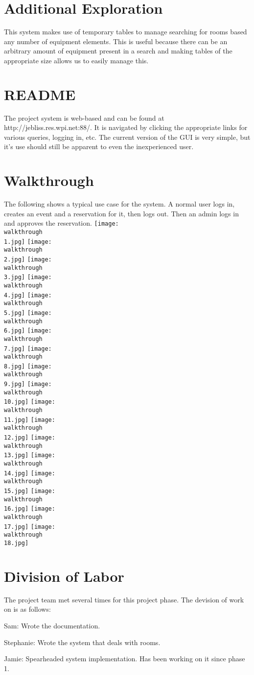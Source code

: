 \documentclass{article}
\begin{document}
\section{Additional Exploration}
This system makes use of temporary tables to manage searching for rooms based any number of equipment elements. This is
useful because there can be an arbitrary amount of equipment present in a search and making tables of the appropriate size
allows us to easily manage this.

\section{README}
The project system is web-based and can be found at http://jebliss.res.wpi.net:88/.
It is navigated by clicking the appropriate links for various queries, logging in, etc.
The current version of the GUI is very simple, but it's use should still be apparent to even the inexperienced user.

\section{Walkthrough}
The following shows a typical use case for the system.
A normal user logs in, creates an event and a reservation for it, then logs out.
Then an admin logs in and approves the reservation.
\texttt{[image: \\walkthrough\\1.jpg]}
\texttt{[image: \\walkthrough\\2.jpg]}
\texttt{[image: \\walkthrough\\3.jpg]}
\texttt{[image: \\walkthrough\\4.jpg]}
\texttt{[image: \\walkthrough\\5.jpg]}
\texttt{[image: \\walkthrough\\6.jpg]}
\texttt{[image: \\walkthrough\\7.jpg]}
\texttt{[image: \\walkthrough\\8.jpg]}
\texttt{[image: \\walkthrough\\9.jpg]}
\texttt{[image: \\walkthrough\\10.jpg]}
\texttt{[image: \\walkthrough\\11.jpg]}
\texttt{[image: \\walkthrough\\12.jpg]}
\texttt{[image: \\walkthrough\\13.jpg]}
\texttt{[image: \\walkthrough\\14.jpg]}
\texttt{[image: \\walkthrough\\15.jpg]}
\texttt{[image: \\walkthrough\\16.jpg]}
\texttt{[image: \\walkthrough\\17.jpg]}
\texttt{[image: \\walkthrough\\18.jpg]}

\section{Division of Labor}
The project team met several times for this project phase. The devision of work on is as follows:

Sam:
Wrote the documentation.

Stephanie:
Wrote the system that deals with rooms.

Jamie:
Spearheaded system implementation. Has been working on it since phase 1.
\end{document}
